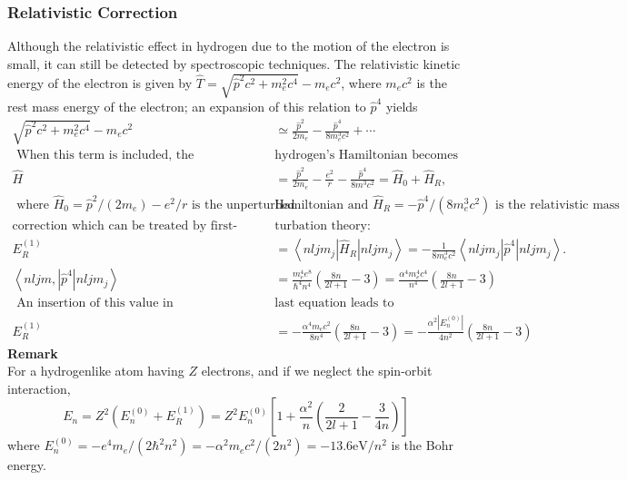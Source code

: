 \subsubsection{Relativistic Correction}
Although the relativistic effect in hydrogen due to the motion of the electron is small, it can still be detected by spectroscopic techniques. The relativistic kinetic energy of the electron is given by $\hat{T}=\sqrt{\hat{p}^{2} c^{2}+m_{e}^{2} c^{4}}-m_{e} c^{2}$, where $m_{e} c^{2}$ is the rest mass energy of the electron; an expansion of this relation to $\hat{p}^{4}$ yields
	$$
	\begin{aligned}
	\sqrt{\hat{p}^{2} c^{2}+m_{e}^{2} c^{4}}-m_{e} c^{2} &\simeq \frac{\hat{p}^{2}}{2 m_{e}}-\frac{\hat{p}^{4}}{8 m_{e}^{3} c^{2}}+\cdots\\
\text{	When this term is included, the } &\text{hydrogen's Hamiltonian becomes}\\
	\hat{H}&=\frac{\hat{p}^{2}}{2 m_{e}}-\frac{e^{2}}{r}-\frac{\hat{p}^{4}}{8 m^{3} c^{2}}=\hat{H}_{0}+\hat{H}_{R},\\
\text{	where $\hat{H}_{0}=\hat{p}^{2} /\left(2 m_{e}\right)-e^{2} / r$ is the unperturbed  }&\text{Hamiltonian and $\hat{H}_{R}=-\hat{p}^{4} /\left(8 m_{e}^{3} c^{2}\right)$ is the relativistic mass }\\
\text{correction which can be treated by first-order per}&\text{turbation theory:}\\
	E_{R}^{(1)}&=\left\langle n l j m_{j}\left|\hat{H}_{R}\right| n l j m_{j}\right\rangle=-\frac{1}{8 m_{c}^{3} c^{2}}\left\langle n l j m_{j}\left|\hat{p}^{4}\right| n l j m_{j}\right\rangle .\\
	\left\langle n l j m,\left|\hat{p}^{4}\right| n l j m_{j}\right\rangle&=\frac{m_{e}^{4} e^{8}}{\hbar^{4} n^{4}}\left(\frac{8 n}{2 l+1}-3\right)=\frac{\alpha^{4} m_{e}^{4} c^{4}}{n^{4}}\left(\frac{8 n}{2 l+1}-3\right)\\
\text{	An insertion of this value in }&\text{last equation leads to}\\
	E_{R}^{(1)}&=-\frac{\alpha^{4} m_{e} c^{2}}{8 n^{4}}\left(\frac{8 n}{2 l+1}-3\right)=-\frac{\alpha^{2}\left|E_{n}^{(0)}\right|}{4 n^{2}}\left(\frac{8 n}{2 l+1}-3\right)
\end{aligned}
$$
\textbf{Remark}\\
For a hydrogenlike atom having $Z$ electrons, and if we neglect the spin-orbit interaction,
$$
E_{n}=Z^{2}\left(E_{n}^{(0)}+E_{R}^{(1)}\right)=Z^{2} E_{n}^{(0)}\left[1+\frac{\alpha^{2}}{n}\left(\frac{2}{2 l+1}-\frac{3}{4 n}\right)\right]
$$
where $E_{n}^{(0)}=-e^{4} m_{e} /\left(2 \hbar^{2} n^{2}\right)=-\alpha^{2} m_{e} c^{2} /\left(2 n^{2}\right)=-13.6 \mathrm{eV} / n^{2}$ is the Bohr energy.
